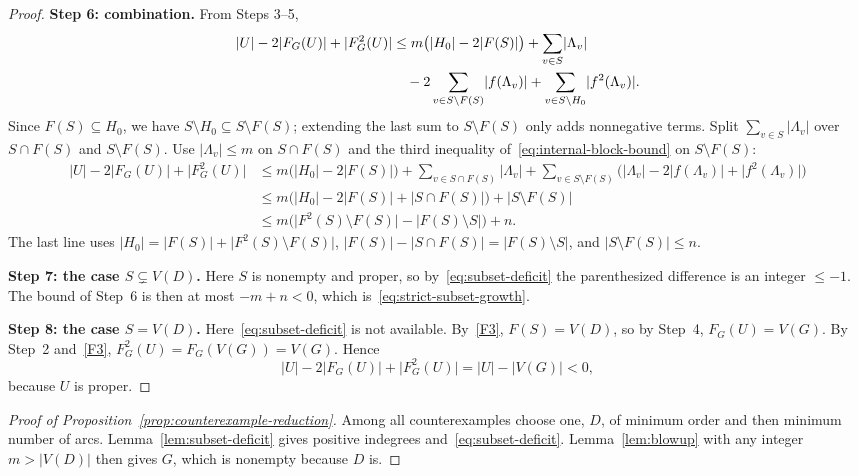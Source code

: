 \documentclass[11pt]{article}
\theoremstyle{remark}
\newcommand{\abs}[1]{\lvert #1\rvert}
\newcommand{\step}[1]{\par\medskip\noindent\textbf{#1}\enspace}
\begin{document}
\begin{proof}
\step{Step 6: combination.}
From Steps 3--5,
\begin{align}
\label{eq:blowup-sharp}
  \abs{U}-2\abs{F_G(U)}+\abs{F_G^2(U)}
  &\le m\bigl(\abs{H_0}-2\abs{F(S)}\bigr)
       +\sum_{v\in S}\abs{\Lambda_v} \notag\\
  &\quad -2\sum_{v\in S\setminus F(S)}\abs{f(\Lambda_v)}
       +\sum_{v\in S\setminus H_0}\abs{f^2(\Lambda_v)}.
\end{align}
Since $F(S)\subseteq H_0$, we have $S\setminus H_0\subseteq S\setminus F(S)$;
extending the last sum to $S\setminus F(S)$ only adds nonnegative terms.
Split $\sum_{v\in S}\abs{\Lambda_v}$ over $S\cap F(S)$ and
$S\setminus F(S)$.  Use $\abs{\Lambda_v}\le m$ on $S\cap F(S)$ and the third
inequality of~\eqref{eq:internal-block-bound} on $S\setminus F(S)$:
\begin{align*}
  \abs{U}-2\abs{F_G(U)}+\abs{F_G^2(U)}
  &\le m\bigl(\abs{H_0}-2\abs{F(S)}\bigr)
     +\sum_{v\in S\cap F(S)}\abs{\Lambda_v}
     +\sum_{v\in S\setminus F(S)}
       \bigl(\abs{\Lambda_v}-2\abs{f(\Lambda_v)}+\abs{f^2(\Lambda_v)}\bigr)\\
  &\le m\bigl(\abs{H_0}-2\abs{F(S)}
                    +\abs{S\cap F(S)}\bigr)
       +\abs{S\setminus F(S)}\\
  &\le m\bigl(\abs{F^2(S)\setminus F(S)}
                    -\abs{F(S)\setminus S}\bigr)+n.
\end{align*}
The last line uses $\abs{H_0}=\abs{F(S)}+\abs{F^2(S)\setminus F(S)}$,
$\abs{F(S)}-\abs{S\cap F(S)}=\abs{F(S)\setminus S}$, and
$\abs{S\setminus F(S)}\le n$.

\step{Step 7: the case $S\subsetneq V(D)$.}
Here $S$ is nonempty and proper, so by~\eqref{eq:subset-deficit} the
parenthesized difference is an integer $\le-1$.  The bound of Step~6 is
then at most $-m+n<0$, which is~\eqref{eq:strict-subset-growth}.

\step{Step 8: the case $S=V(D)$.}
Here~\eqref{eq:subset-deficit} is not available.  By~\ref{F3},
$F(S)=V(D)$, so by Step~4, $F_G(U)=V(G)$.  By Step~2 and~\ref{F3},
$F_G^2(U)=F_G(V(G))=V(G)$.  Hence
\[
  \abs{U}-2\abs{F_G(U)}+\abs{F_G^2(U)}
  =\abs{U}-\abs{V(G)}<0,
\]
because $U$ is proper.
\end{proof}

\begin{proof}[Proof of Proposition~\ref{prop:counterexample-reduction}]
Among all counterexamples choose one, $D$, of minimum order and then minimum
number of arcs.  Lemma~\ref{lem:subset-deficit} gives positive indegrees
and~\eqref{eq:subset-deficit}.  Lemma~\ref{lem:blowup} with any integer
$m>\abs{V(D)}$ then gives $G$, which is nonempty because $D$ is.
\end{proof}
\end{document}
